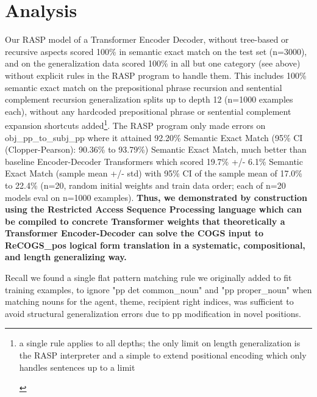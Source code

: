 \documentclass[11pt]{article}
\begin{document}
\section{Analysis} 
Our RASP model of a Transformer Encoder Decoder, without tree-based or recursive aspects scored 100\% in semantic exact match on the \cite{Wu2023} test set (n=3000), and on the generalization data scored 100\% in all but one category (see above) without explicit rules in the RASP program to handle them. This includes 100\% semantic exact match on the prepositional phrase recursion and sentential complement recursion generalization splits up to depth 12 (n=1000 examples each), without any hardcoded prepositional phrase or sentential complement expansion shortcuts added\footnote{\begin{footnotesize}a single rule applies to all depths; the only limit on length generalization is the RASP interpreter and a simple to extend positional encoding which only handles sentences up to a limit
\end{footnotesize}}. The RASP program only made errors on obj\_pp\_to\_subj\_pp where it attained 92.20\% Semantic Exact Match (95\% CI (Clopper-Pearson): 90.36\% to 93.79\%) Semantic Exact Match, much better than \cite{Wu2023} baseline Encoder-Decoder Transformers which scored 19.7\% +/- 6.1\% Semantic Exact Match (sample mean +/- std) with 95\% CI of the sample mean of 17.0\% to 22.4\% (n=20, random initial weights and train data order; each of n=20 models eval on n=1000 examples). \textbf{Thus, we demonstrated by construction using the Restricted Access Sequence Processing language which can be compiled to concrete Transformer weights that theoretically a Transformer Encoder-Decoder can solve the COGS input to ReCOGS\_pos logical form translation in a systematic, compositional, and length generalizing way.}

Recall we found a single flat pattern matching rule we originally added to fit training examples, to ignore "pp det common\_noun" and "pp proper\_noun" when matching nouns for the agent, theme, recipient right indices, was sufficient to avoid structural generalization errors due to pp modification in novel positions. 
\end{document}
